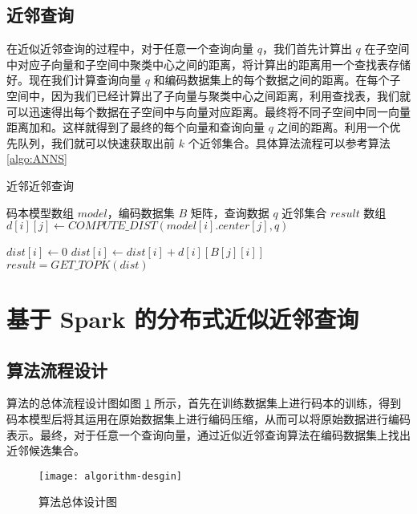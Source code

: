 \subsection{近邻查询}
在近似近邻查询的过程中，对于任意一个查询向量 $q$，我们首先计算出 $q$ 在子空间中对应子向量和子空间中聚类中心之间的距离，将计算出的距离用一个查找表存储好。现在我们计算查询向量 $q$ 和编码数据集上的每个数据之间的距离。在每个子空间中，因为我们已经计算出了子向量与聚类中心之间距离，利用查找表，我们就可以迅速得出每个数据在子空间中与向量对应距离。最终将不同子空间中同一向量距离加和。这样就得到了最终的每个向量和查询向量 $q$ 之间的距离。利用一个优先队列，我们就可以快速获取出前 $k$ 个近邻集合。具体算法流程可以参考算法 \ref{algo:ANNS}
\begin{algorithm}
    \caption{近邻近邻查询}
    \label{algo:ANNS}
    \begin{algorithmic}[1] %
        \Require 码本模型数组 $model$，编码数据集 $B$ 矩阵，查询数据 $q$
        \Ensure 近邻集合 $result$ 数组
                    \State $d[i][j] \gets COMPUTE\_DIST(model[i].center[j], q) $
                \EndFor
            \EndFor

                \State $dist[i] \gets 0$
                    \State $dist[i] \gets dist[i] + d[i][B[j][i]]$
                \EndFor
            \EndFor
            \State $result = GET\_TOPK(dist)$
            \State {}
        \EndFunction
    \end{algorithmic}
\end{algorithm}
\section{基于 Spark 的分布式近似近邻查询}
\subsection{算法流程设计}
算法的总体流程设计图如图 \ref{fig:algorithm-desgin} 所示，首先在训练数据集上进行码本的训练，得到码本模型后将其运用在原始数据集上进行编码压缩，从而可以将原始数据进行编码表示。最终，对于任意一个查询向量，通过近似近邻查询算法在编码数据集上找出近邻候选集合。
\begin{figure}[H]
  \centering
  \texttt{[image: algorithm-desgin]}
  \caption{算法总体设计图}
  \label{fig:algorithm-desgin}
\end{figure}
